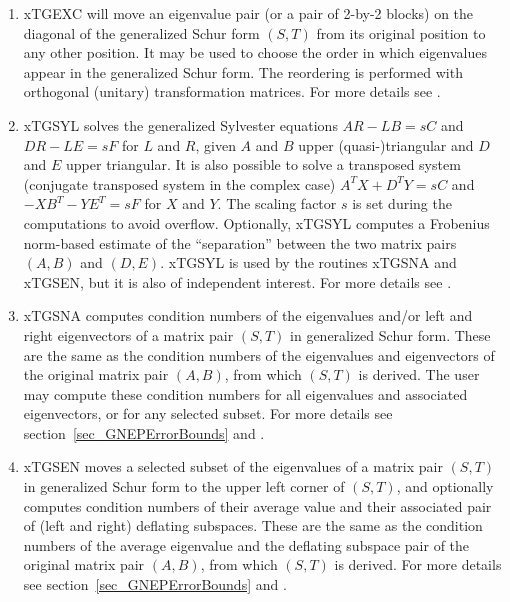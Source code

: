 \begin{enumerate}

\item xTGEXC
      will move an eigenvalue pair (or a pair of 2-by-2 blocks)
      on the diagonal of the generalized Schur form $(S,T)$
      from its
      original position to any other position.  It may be used to choose
      the order in which eigenvalues appear in the generalized Schur
      form.  The reordering is performed with orthogonal (unitary)
      transformation matrices.  For more details see
      \cite{kagstrom93,kagstromporomaa94a}.

\item xTGSYL
      solves the generalized Sylvester equations
      $AR - LB = sC$ and $DR - LE =sF$ for $L$ and $R$, given $A$ and $B$
      upper (quasi-)triangular and $D$ and $E$ upper triangular.  It
      is also possible to solve a transposed system (conjugate transposed
      system in the complex case) $A^T X + D^T Y = sC$ and
      $-X B^T - Y E^T = sF$
      for $X$ and $Y$.  The scaling factor $s$ is set during the
      computations to avoid overflow.  Optionally, xTGSYL computes a
      Frobenius norm-based estimate of the ``separation'' between the two
      matrix pairs $(A,B)$ and $(D,E)$.  xTGSYL is used by the routines
      xTGSNA and xTGSEN, but it is also of independent interest.
      For more details see \cite{kagstrom94,kagstromporomaa93a,
      kagstromwestin89}.

\item xTGSNA
      computes condition numbers of the
      eigenvalues and/or left and right eigenvectors of a matrix pair
      $(S,T)$ in generalized Schur form.
      These are the same as the
      condition numbers of the eigenvalues and eigenvectors of the
      original matrix pair $(A,B)$, from which $(S,T)$ is derived. The
      user may compute these condition numbers for all eigenvalues and
      associated eigenvectors, or for any selected subset.  For more
      details see section~\ref{sec_GNEPErrorBounds} and
      \cite{kagstromporomaa94a}.

\item xTGSEN
      moves a selected subset of the eigenvalues of a matrix pair
      $(S,T)$ in generalized Schur form to the upper left corner of
      $(S,T)$, and optionally computes condition numbers
      of their average value and their associated pair of (left
      and right) deflating subspaces.  These are the same as the condition
      numbers of the average eigenvalue and the deflating subspace pair
      of the original matrix pair $(A,B)$, from which $(S,T)$ is derived.
      For more details see section~\ref{sec_GNEPErrorBounds} and
      \cite{kagstromporomaa94a}.

\end{enumerate}

